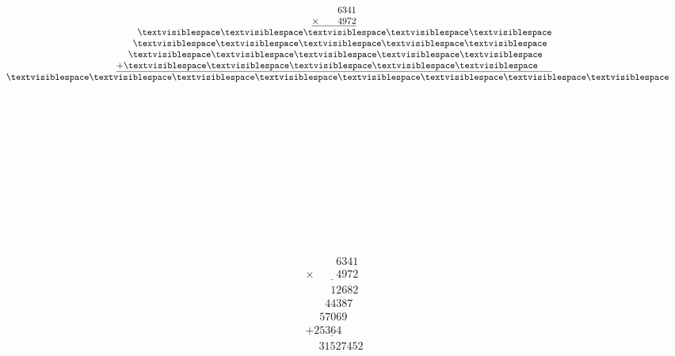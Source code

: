 \begin{minipage}[t]{0.3\linewidth}
\begin{align*}\begin{array}{c}
\phantom{
\times0000
}
6341\\
\underline{
\times
\phantom{
0000
}
4972
}\\
\phantom{
+000
}
\textvisiblespace
\textvisiblespace
\textvisiblespace
\textvisiblespace
\textvisiblespace
\\
\phantom{
+00
}
\textvisiblespace
\textvisiblespace
\textvisiblespace
\textvisiblespace
\textvisiblespace
\phantom0\\
\phantom{
+0
}
\textvisiblespace
\textvisiblespace
\textvisiblespace
\textvisiblespace
\textvisiblespace
\phantom0\phantom0\\
\underline{
+
\textvisiblespace
\textvisiblespace
\textvisiblespace
\textvisiblespace
\textvisiblespace
\phantom0\phantom0\phantom0
}
\\
\phantom{+}
\textvisiblespace
\textvisiblespace
\textvisiblespace
\textvisiblespace
\textvisiblespace
\textvisiblespace
\textvisiblespace
\textvisiblespace
\end{array}\end{align*}
\end{minipage}
\begin{minipage}[t]{0.05\linewidth}
\begin{align*}\begin{array}{c}
\textvisiblespace
\\
\textvisiblespace
\\
\textvisiblespace
\\
\textvisiblespace
\\
\textvisiblespace
\\
\textvisiblespace
\\
\textvisiblespace
\end{array}\end{align*}
\end{minipage}
\begin{minipage}[t]{0.05\linewidth}
\begin{align*}\begin{array}{c}
\textvisiblespace
\\
\textvisiblespace
\\
\textvisiblespace
\end{array}\end{align*}
\end{minipage}
\begin{minipage}[t]{0.3\linewidth}
\begin{align*}\begin{array}{c}
\phantom{
\times0000
}
6341\\
\underline{
\times
\phantom{
0000
}
4972
}\\
\phantom{
+000
}
12682
\\
\phantom{
+00
}
44387
\phantom0\\
\phantom{
+0
}
57069
\phantom0\phantom0\\
\underline{
+
25364
\phantom0\phantom0\phantom0
}
\\
\phantom{+}
31527452
\end{array}\end{align*}
\end{minipage}
